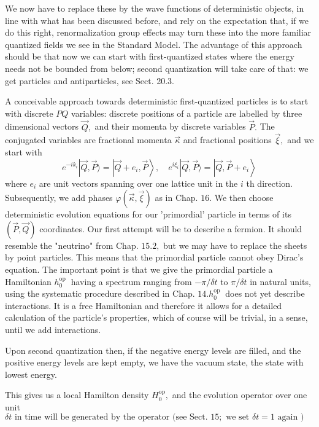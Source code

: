 \documentclass[main.tex]{subfiles}
\begin{document}
We now have to replace these by the wave functions of deterministic objects, in line with what has been discussed before, and rely on the expectation that, if we do this right, renormalization group effects may turn these into the more familiar quantized fields we see in the Standard Model. The advantage of this approach should be that now we can start with first-quantized states where the energy needs not be bounded from below; second quantization will take care of that: we get particles and antiparticles, see Sect. 20.3.

A conceivable approach towards deterministic first-quantized particles is to start with discrete $PQ$ variables: discrete positions of a particle are labelled by three dimensional vectors $\vec{Q},$ and their momenta by discrete variables $\vec{P} .$ The conjugated variables are fractional momenta $\vec{\kappa}$ and fractional positions $\vec{\xi},$ and we start with
$$
e^{-i k_{i}}|\vec{Q}, \vec{P}\rangle=\left|\vec{Q}+e_{i}, \vec{P}\right\rangle, \quad e^{i \xi_{i}}|\vec{Q}, \vec{P}\rangle=\left|\vec{Q}, \vec{P}+e_{i}\right\rangle
$$
where $e_{i}$ are unit vectors spanning over one lattice unit in the $i$ th direction. Subsequently, we add phases $\varphi(\vec{\kappa}, \vec{\xi})$ as in Chap. $16 .$ We then choose deterministic evolution equations for our 'primordial' particle in terms of its $(\vec{P}, \vec{Q})$ coordinates. Our first attempt will be to describe a fermion. It should resemble the "neutrino" from Chap. $15.2,$ but we may have to replace the sheets by point particles. This means that the primordial particle cannot obey Dirac's equation. The important point is that we give the primordial particle a Hamiltonian $h_{0}^{\text {op }}$ having a spectrum ranging from $-\pi / \delta t$ to $\pi / \delta t$ in natural units, using the systematic procedure described in Chap. $14 . h_{0}^{\text {op }}$ does not yet describe interactions. It is a free Hamiltonian and therefore it allows for a detailed calculation of the particle's properties, which of course will be trivial, in a sense, until we add interactions.

Upon second quantization then, if the negative energy levels are filled, and the positive energy levels are kept empty, we have the vacuum state, the state with lowest energy.

This gives us a local Hamilton density $H_{0}^{\mathrm{op}},$ and the evolution operator over one unit $\delta t \text { in time will be generated by the operator (see Sect. } 15 ; \text { we set } \delta t=1 \text { again })$
\end{document}
